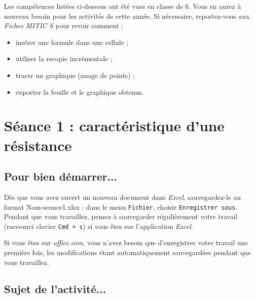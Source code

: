 \phantom{rien}

Les compétences listées ci-dessous ont été vues en classe de 6. Vous en aurez à nouveau besoin pour les activités de cette année. Si nécessaire, reportez-vous aux \emph{Fiches MITIC 6} pour revoir comment :  

\begin{itemize}
\item insérer une formule dans une cellule ;
\item utiliser la recopie incrémentale ;
\item tracer un graphique (nuage de points) ;
\item exporter la feuille et le graphique obtenus.
\end{itemize}



%
%
%
%

\newpage



\section{Séance 1 : caractéristique d'une résistance}\label{ficheTableur5e1}


\subsection{Pour bien démarrer...}

Dès que vous avez ouvert un nouveau document dans \emph{Excel}, sauvegardez-le au format Nom-seance1.xlsx : dans le menu \texttt{Fichier}, choisir \texttt{Enregistrer sous}. Pendant que vous travaillez, pensez à sauvegarder régulièrement votre travail (raccourci clavier \texttt{Cmd + s}) si vous êtes sur l'application \emph{Excel}.


Si vous êtes sur \emph{office.com}, vous n'avez besoin que d'enregistrer votre travail une première fois, les modifications étant automatiquement sauvegardées pendant que vous travaillez.


\subsection{Sujet de l'activité...}

